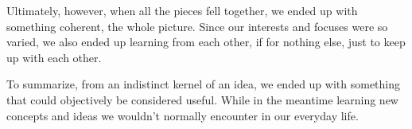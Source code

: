 Ultimately, however, when all the pieces fell together, we ended up with something coherent, the whole picture.
Since our interests and focuses were so varied, we also ended up learning from each other,
if for nothing else, just to keep up with each other.

To summarize, from an indistinct kernel of an idea, we ended up with something
that could objectively be considered useful.
While in the meantime learning new concepts and ideas we wouldn't normally encounter in our
everyday life.

